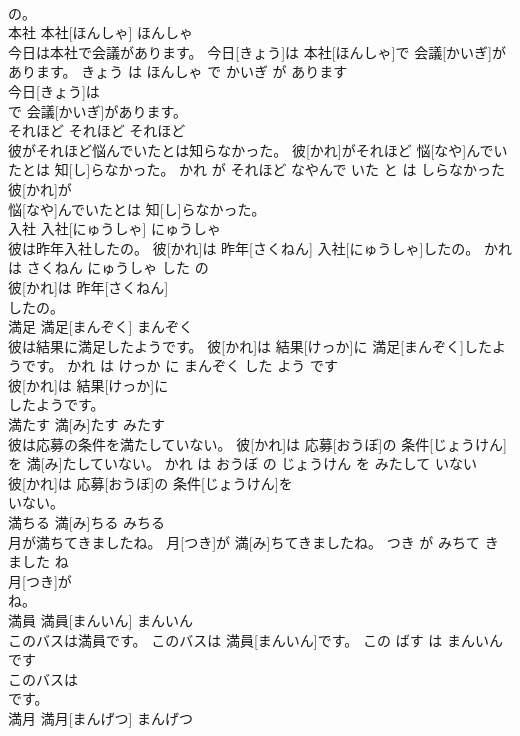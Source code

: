 \documentclass[8pt]{extreport}
\begin{document}
\begin{CJK}{UTF8}{min}
\\	の。			
\\	本社	本社[ほんしゃ]	ほんしゃ	
\\	今日は本社で会議があります。	今日[きょう]は 本社[ほんしゃ]で 会議[かいぎ]があります。	きょう は ほんしゃ で かいぎ が あります	
\\	今日[きょう]は
\\	で 会議[かいぎ]があります。			
\\	それほど	それほど	それほど	
\\	彼がそれほど悩んでいたとは知らなかった。	彼[かれ]がそれほど 悩[なや]んでいたとは 知[し]らなかった。	かれ が それほど なやんで いた と は しらなかった	
\\	彼[かれ]が
\\	悩[なや]んでいたとは 知[し]らなかった。			
\\	入社	入社[にゅうしゃ]	にゅうしゃ	
\\	彼は昨年入社したの。	彼[かれ]は 昨年[さくねん] 入社[にゅうしゃ]したの。	かれ は さくねん にゅうしゃ した の	
\\	彼[かれ]は 昨年[さくねん]
\\	したの。			
\\	満足	満足[まんぞく]	まんぞく	
\\	彼は結果に満足したようです。	彼[かれ]は 結果[けっか]に 満足[まんぞく]したようです。	かれ は けっか に まんぞく した よう です	
\\	彼[かれ]は 結果[けっか]に
\\	したようです。			
\\	満たす	満[み]たす	みたす	
\\	彼は応募の条件を満たしていない。	彼[かれ]は 応募[おうぼ]の 条件[じょうけん]を 満[み]たしていない。	かれ は おうぼ の じょうけん を みたして いない	
\\	彼[かれ]は 応募[おうぼ]の 条件[じょうけん]を
\\	いない。			
\\	満ちる	満[み]ちる	みちる	
\\	月が満ちてきましたね。	月[つき]が 満[み]ちてきましたね。	つき が みちて きました ね	
\\	月[つき]が
\\	ね。			
\\	満員	満員[まんいん]	まんいん	
\\	このバスは満員です。	このバスは 満員[まんいん]です。	この ばす は まんいん です	
\\	このバスは
\\	です。			
\\	満月	満月[まんげつ]	まんげつ	

\end{CJK}
\end{document}

